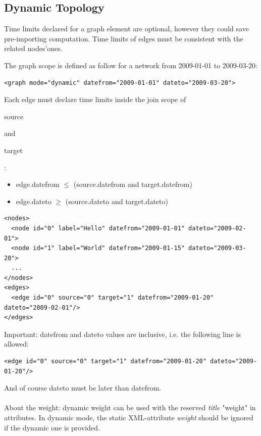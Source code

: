 \documentclass[a4paper,10pt]{article}
\begin{document}
\subsection{Dynamic Topology}

Time limits declared for a graph element are optional, however they could save pre-importing computation. Time limits of edges must be consistent with the related nodes'ones.

The graph scope is defined as follow for a network from 2009-01-01 to 2009-03-20:

\lstset{ style=gexf }
\begin{lstlisting}[caption={Graph Scope Example}]
<graph mode="dynamic" datefrom="2009-01-01" dateto="2009-03-20">
\end{lstlisting}

Each edge must declare time limits inside the join scope of \begin{footnotesize}source\end{footnotesize} and \begin{footnotesize}target\end{footnotesize}:
\begin{itemize}
 \item edge.datefrom $\le$ (source.datefrom and target.datefrom)
 \item edge.dateto   $\ge$ (source.dateto   and target.dateto)
\end{itemize}

\lstset{ style=gexf }
\begin{lstlisting}[caption={Edge Scope Example}]
<nodes>
  <node id="0" label="Hello" datefrom="2009-01-01" dateto="2009-02-01">
  <node id="1" label="World" datefrom="2009-01-15" dateto="2009-03-20">
  ...
</nodes>
<edges>
  <edge id="0" source="0" target="1" datefrom="2009-01-20" dateto="2009-02-01"/>
</edges>
\end{lstlisting}

Important: datefrom and dateto values are inclusive, i.e. the following line is allowed:

\lstset{ style=gexf }
\begin{lstlisting}[caption={Smallest time scope}]
<edge id="0" source="0" target="1" datefrom="2009-01-20" dateto="2009-01-20"/>
\end{lstlisting}

And of course dateto must be later than datefrom.

\paragraph{}
About the weight: dynamic weight can be used with the reserved \textit{title} "weight" in attributes. In dynamic mode, the static XML-attribute \textit{weight} should be ignored if the dynamic one is provided.
\end{document}

